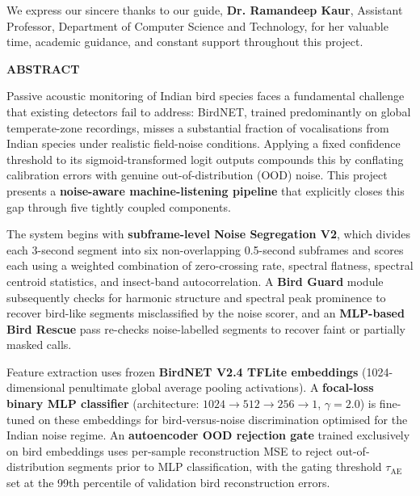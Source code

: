 \documentclass[a4paper,12pt]{article}
\begin{document}
\vspace{0.3cm}

\noindent
We express our sincere thanks to our guide, \textbf{Dr. Ramandeep Kaur}, Assistant Professor,
Department of Computer Science and Technology, for her valuable time, academic guidance, and constant
support throughout this project.

\newpage
\thispagestyle{plain}

\begin{center}
{\fontsize{18}{20}\bfseries ABSTRACT}
\end{center}


\vspace{0.5cm}

\justify
\noindent
Passive acoustic monitoring of Indian bird species faces a fundamental challenge that existing detectors
fail to address: BirdNET, trained predominantly on global temperate-zone recordings, misses a substantial
fraction of vocalisations from Indian species under realistic field-noise conditions. Applying a fixed
confidence threshold to its sigmoid-transformed logit outputs compounds this by conflating calibration
errors with genuine out-of-distribution (OOD) noise. This project presents a \textbf{noise-aware
machine-listening pipeline} that explicitly closes this gap through five tightly coupled components.

\vspace{0.3cm}

\noindent
The system begins with \textbf{subframe-level Noise Segregation V2}, which divides each 3-second
segment into six non-overlapping 0.5-second subframes and scores each using a weighted combination
of zero-crossing rate, spectral flatness, spectral centroid statistics, and insect-band autocorrelation.
A \textbf{Bird Guard} module subsequently checks for harmonic structure and spectral peak prominence
to recover bird-like segments misclassified by the noise scorer, and an \textbf{MLP-based Bird Rescue}
pass re-checks noise-labelled segments to recover faint or partially masked calls.

\vspace{0.3cm}

\noindent
Feature extraction uses frozen \textbf{BirdNET V2.4 TFLite embeddings} (1024-dimensional penultimate
global average pooling activations). A \textbf{focal-loss binary MLP classifier} (architecture:
$1024 \to 512 \to 256 \to 1$, $\gamma = 2.0$) is fine-tuned on these embeddings for
bird-versus-noise discrimination optimised for the Indian noise regime. An \textbf{autoencoder OOD
rejection gate} trained exclusively on bird embeddings uses per-sample reconstruction MSE to reject
out-of-distribution segments prior to MLP classification, with the gating threshold $\tau_{\mathrm{AE}}$
set at the 99th percentile of validation bird reconstruction errors.
\end{document}
